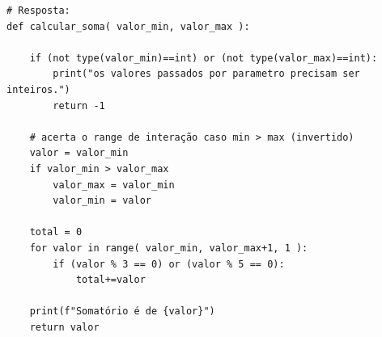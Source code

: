 \ifmostrarGabarito
\begin{verbatim}
# Resposta:
def calcular_soma( valor_min, valor_max ):

    if (not type(valor_min)==int) or (not type(valor_max)==int):
        print("os valores passados por parametro precisam ser inteiros.")
        return -1
        
    # acerta o range de interação caso min > max (invertido)
    valor = valor_min 
    if valor_min > valor_max
        valor_max = valor_min
        valor_min = valor

    total = 0
    for valor in range( valor_min, valor_max+1, 1 ):
        if (valor % 3 == 0) or (valor % 5 == 0):
            total+=valor

    print(f"Somatório é de {valor}")
    return valor

\end{verbatim}
\fi

